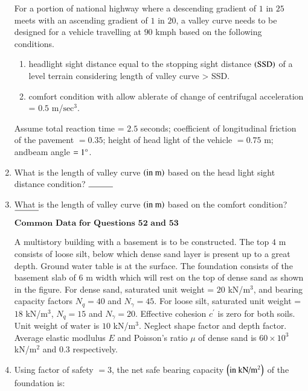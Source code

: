 \documentclass[journal,onecolumn]{IEEEtran}
\theoremstyle{remark}
\begin{document}
\begin{enumerate}
	For a portion of national highway where a descending gradient of $1$ in $25$ meets with an ascending gradient of $1$ in $20$, a valley curve needs to be designed for a vehicle travelling at $90$ kmph based on the following conditions.
	\begin{enumerate}
		\item headlight sight distance equal to the stopping sight distance $\left(\text{SSD}\right)$ of a level terrain
considering length of valley curve > SSD. 
		\item comfort condition with allow ablerate of change of centrifugal acceleration = $0.5$ m/$\text{sec}^3$.
	\end{enumerate}
	Assume total reaction time = $2.5$ seconds; coefficient of longitudinal friction of the pavement $= 0.35$; height
of head light of the vehicle $= 0.75$ m; andbeam angle $= 1\degree$. 

    \item What is the length of valley curve $\left(\text{in m}\right)$ based on the head light sight distance condition? $\rule{1cm}{0.15mm}$

    \item What is the length of valley curve $\left(\text{in m}\right)$ based on the comfort condition? $\rule{1cm}{0.15mm}$

	$\textbf{Common Data for Questions 52 and 53}$
	\newline

	A multistory building with a basement is to be constructed. The top $4$ m consists of loose silt, below which dense sand layer is present up to a great depth. Ground water table is at the surface. The foundation consists of the basement slab of $6$ m width which will rest on the top of dense sand as shown in the figure. For dense sand, saturated unit weight = $20$ kN/$\text{m}^3$, and bearing capacity factors $N_q = 40$ and $N_{\gamma} = 45$. For loose silt, saturated unit weight = $18$ kN/$\text{m}^3$, $N_q = 15$ and $N_{\gamma} = 20$. Effective cohesion $c^{\prime}$ is zero for both soils. Unit weight of water is $10$ kN/$\text{m}^3$. Neglect shape factor and depth factor. 
	\newline
	Average elastic modlulus $E$ and Poisson's ratio $\mu$ of dense sand is $60 \times 10^3$ kN/$\text{m}^2$ and $0.3$ respectively.

    \item Using factor of safety $= 3$, the net safe bearing capacity $\left(\text{in kN/} \text{m}^2\right)$ of the foundation is:


\end{enumerate}
\end{document}

